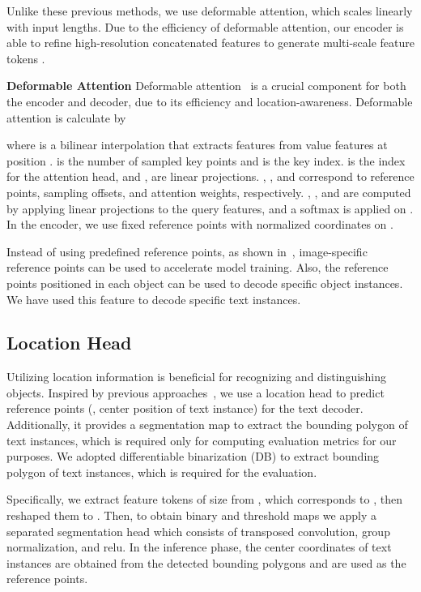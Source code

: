\documentclass[10pt,twocolumn,letterpaper]{article}
\begin{document}
Unlike these previous methods, we use deformable attention, which scales linearly with input lengths. Due to the efficiency of deformable attention, our encoder is able to refine high-resolution concatenated features to generate multi-scale feature tokens .

\noindent\textbf{Deformable Attention} Deformable attention~\cite{zhu2021deformable} is a crucial component for both the encoder and decoder, due to its efficiency and location-awareness. Deformable attention is calculate by

where  is a bilinear interpolation that extracts features from value features  at position .  is the number of sampled key points and  is the key index.  is the index for the attention head, and ,  are linear projections. , , and  correspond to reference points, sampling offsets, and attention weights, respectively. , , and  are computed by applying linear projections to the query features, and a softmax is applied on . In the encoder, we use fixed reference points with normalized coordinates on .


Instead of using predefined reference points, as shown in~\cite{yao2021efficient}, image-specific reference points can be used to accelerate model training. Also, the reference points positioned in each object can be used to decode specific object instances. We have used this feature to decode specific text instances.

\subsection{Location Head}

Utilizing location information is beneficial for recognizing and distinguishing objects. Inspired by previous approaches~\cite{yao2021efficient, li2021panoptic}, we use a location head to predict reference points (\ie, center position of text instance) for the text decoder.
Additionally, it provides a segmentation map to extract the bounding polygon of text instances, which is required only for computing evaluation metrics for our purposes. We adopted differentiable binarization (DB) \cite{liao2020real} to extract bounding polygon of text instances, which is required for the evaluation.

Specifically, we extract feature tokens of size  from , which corresponds to , then reshaped them to . Then, to obtain binary and threshold maps we apply a separated segmentation head which consists of transposed convolution, group normalization, and relu. In the inference phase, the center coordinates of text instances are obtained from the detected bounding polygons and are used as the reference points.
\end{document}
